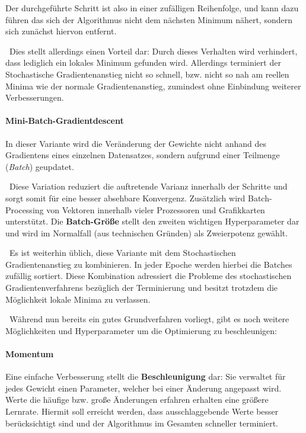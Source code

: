 Der durchgeführte Schritt ist also in einer zufälligen Reihenfolge, und kann dazu führen das sich der Algorithmus nicht dem nächsten Minimum nähert, sondern sich zunächst hiervon entfernt. 

~\newline Dies stellt allerdings einen Vorteil dar: Durch dieses Verhalten wird verhindert, dass lediglich ein lokales Minimum gefunden wird. Allerdings terminiert der Stochastische Gradientenanstieg nicht so schnell, bzw. nicht so nah am reellen Minima wie der normale Gradientenanstieg, zumindest ohne Einbindung weiterer Verbesserungen.

\paragraph{Mini-Batch-Gradientdescent} In dieser Variante wird die Veränderung der Gewichte nicht anhand des Gradientens eines einzelnen Datensatzes, sondern aufgrund einer Teilmenge (\textit{Batch}) geupdatet. 

~\newline Diese Variation reduziert die auftretende Varianz innerhalb der Schritte und sorgt somit für eine besser absehbare Konvergenz. Zusätzlich wird Batch-Processing von Vektoren innerhalb vieler Prozessoren und Grafikkarten unterstützt. Die \textbf{Batch-Größe} stellt den zweiten wichtigen Hyperparameter dar und wird im Normalfall (aus technischen Gründen) als Zweierpotenz gewählt.   

~\newline Es ist weiterhin üblich, diese Variante mit dem Stochastischen Gradientenanstieg zu kombinieren. In jeder Epoche werden hierbei die Batches zufällig sortiert. Diese Kombination adressiert die Probleme des stochastischen Gradientenverfahrens bezüglich der Terminierung und besitzt trotzdem die Möglichkeit lokale Minima zu verlassen.  

~\newline Während nun bereits ein gutes Grundverfahren vorliegt, gibt es noch weitere Möglichkeiten und Hyperparameter um die Optimierung zu beschleunigen:

\paragraph{Momentum} Eine einfache Verbesserung stellt die \textbf{Beschleunigung} dar: Sie verwaltet für jedes Gewicht einen Parameter, welcher bei einer Änderung angepasst wird. Werte die häufige bzw. große Änderungen erfahren erhalten eine größere Lernrate. Hiermit soll erreicht werden, dass ausschlaggebende Werte besser berücksichtigt sind und der Algorithmus im Gesamten schneller terminiert. 

